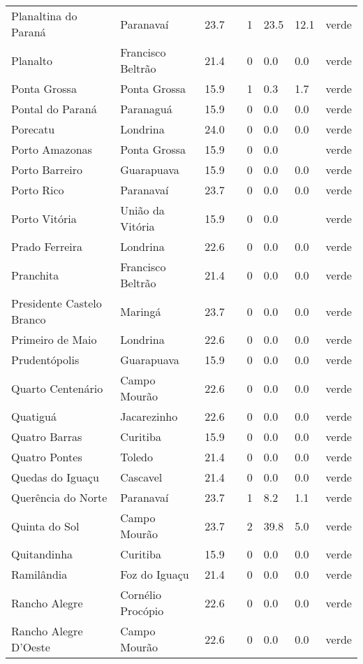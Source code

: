 \begin{longtable}{l|lllllll}
  Planaltina do Paraná & Paranavaí & 23.7 &  & 1 & 23.5 & 12.1 & verde \\ 
  Planalto & Francisco Beltrão & 21.4 &  & 0 & 0.0 & 0.0 & verde \\ 
  Ponta Grossa & Ponta Grossa & 15.9 &  & 1 & 0.3 & 1.7 & verde \\ 
  Pontal do Paraná & Paranaguá & 15.9 &  & 0 & 0.0 & 0.0 & verde \\ 
  Porecatu & Londrina & 24.0 &  & 0 & 0.0 & 0.0 & verde \\ 
  Porto Amazonas & Ponta Grossa & 15.9 &  & 0 & 0.0 &  & verde \\ 
  Porto Barreiro & Guarapuava & 15.9 &  & 0 & 0.0 & 0.0 & verde \\ 
  Porto Rico & Paranavaí & 23.7 &  & 0 & 0.0 & 0.0 & verde \\ 
  Porto Vitória & União da Vitória & 15.9 &  & 0 & 0.0 &  & verde \\ 
  Prado Ferreira & Londrina & 22.6 &  & 0 & 0.0 & 0.0 & verde \\ 
  Pranchita & Francisco Beltrão & 21.4 &  & 0 & 0.0 & 0.0 & verde \\ 
  Presidente Castelo Branco & Maringá & 23.7 &  & 0 & 0.0 & 0.0 & verde \\ 
  Primeiro de Maio & Londrina & 22.6 &  & 0 & 0.0 & 0.0 & verde \\ 
  Prudentópolis & Guarapuava & 15.9 &  & 0 & 0.0 & 0.0 & verde \\ 
  Quarto Centenário & Campo Mourão & 22.6 &  & 0 & 0.0 & 0.0 & verde \\ 
  Quatiguá & Jacarezinho & 22.6 &  & 0 & 0.0 & 0.0 & verde \\ 
  Quatro Barras & Curitiba & 15.9 &  & 0 & 0.0 & 0.0 & verde \\ 
  Quatro Pontes & Toledo & 21.4 &  & 0 & 0.0 & 0.0 & verde \\ 
  Quedas do Iguaçu & Cascavel & 21.4 &  & 0 & 0.0 & 0.0 & verde \\ 
  Querência do Norte & Paranavaí & 23.7 &  & 1 & 8.2 & 1.1 & verde \\ 
  Quinta do Sol & Campo Mourão & 23.7 &  & 2 & 39.8 & 5.0 & verde \\ 
  Quitandinha & Curitiba & 15.9 &  & 0 & 0.0 & 0.0 & verde \\ 
  Ramilândia & Foz do Iguaçu & 21.4 &  & 0 & 0.0 & 0.0 & verde \\ 
  Rancho Alegre & Cornélio Procópio & 22.6 &  & 0 & 0.0 & 0.0 & verde \\ 
  Rancho Alegre D'Oeste & Campo Mourão & 22.6 &  & 0 & 0.0 & 0.0 & verde \\ 

\end{longtable}
